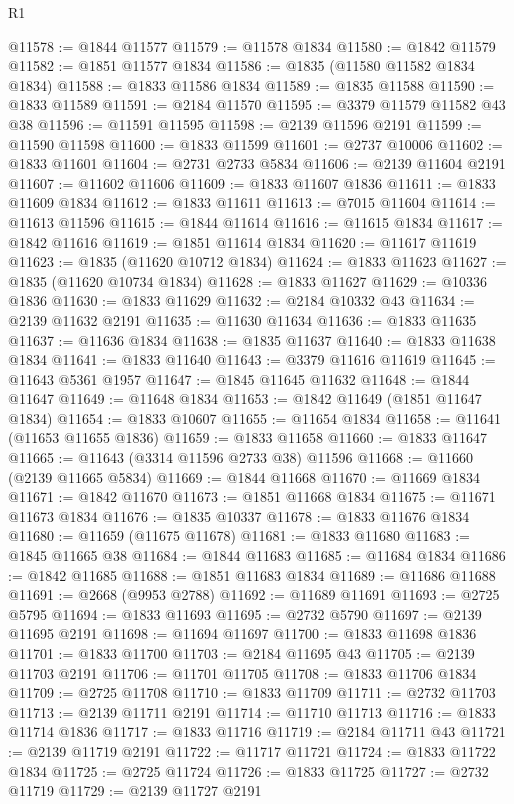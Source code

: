 \begin{lexlean}{R1}
\begin{coremodule}
@11578 := @1844 @11577
@11579 := @11578 @1834
@11580 := @1842 @11579
@11582 := @1851 @11577 @1834
@11586 := @1835 (@11580 @11582 @1834 @1834)
@11588 := @1833 @11586 @1834
@11589 := @1835 @11588
@11590 := @1833 @11589
@11591 := @2184 @11570
@11595 := @3379 @11579 @11582 @43 @38
@11596 := @11591 @11595
@11598 := @2139 @11596 @2191
@11599 := @11590 @11598
@11600 := @1833 @11599
@11601 := @2737 @10006
@11602 := @1833 @11601
@11604 := @2731 @2733 @5834
@11606 := @2139 @11604 @2191
@11607 := @11602 @11606
@11609 := @1833 @11607 @1836
@11611 := @1833 @11609 @1834
@11612 := @1833 @11611
@11613 := @7015 @11604
@11614 := @11613 @11596
@11615 := @1844 @11614
@11616 := @11615 @1834
@11617 := @1842 @11616
@11619 := @1851 @11614 @1834
@11620 := @11617 @11619
@11623 := @1835 (@11620 @10712 @1834)
@11624 := @1833 @11623
@11627 := @1835 (@11620 @10734 @1834)
@11628 := @1833 @11627
@11629 := @10336 @1836
@11630 := @1833 @11629
@11632 := @2184 @10332 @43
@11634 := @2139 @11632 @2191
@11635 := @11630 @11634
@11636 := @1833 @11635
@11637 := @11636 @1834
@11638 := @1835 @11637
@11640 := @1833 @11638 @1834
@11641 := @1833 @11640
@11643 := @3379 @11616 @11619
@11645 := @11643 @5361 @1957
@11647 := @1845 @11645 @11632
@11648 := @1844 @11647
@11649 := @11648 @1834
@11653 := @1842 @11649 (@1851 @11647 @1834)
@11654 := @1833 @10607
@11655 := @11654 @1834
@11658 := @11641 (@11653 @11655 @1836)
@11659 := @1833 @11658
@11660 := @1833 @11647
@11665 := @11643 (@3314 @11596 @2733 @38) @11596
@11668 := @11660 (@2139 @11665 @5834)
@11669 := @1844 @11668
@11670 := @11669 @1834
@11671 := @1842 @11670
@11673 := @1851 @11668 @1834
@11675 := @11671 @11673 @1834
@11676 := @1835 @10337
@11678 := @1833 @11676 @1834
@11680 := @11659 (@11675 @11678)
@11681 := @1833 @11680
@11683 := @1845 @11665 @38
@11684 := @1844 @11683
@11685 := @11684 @1834
@11686 := @1842 @11685
@11688 := @1851 @11683 @1834
@11689 := @11686 @11688
@11691 := @2668 (@9953 @2788)
@11692 := @11689 @11691
@11693 := @2725 @5795
@11694 := @1833 @11693
@11695 := @2732 @5790
@11697 := @2139 @11695 @2191
@11698 := @11694 @11697
@11700 := @1833 @11698 @1836
@11701 := @1833 @11700
@11703 := @2184 @11695 @43
@11705 := @2139 @11703 @2191
@11706 := @11701 @11705
@11708 := @1833 @11706 @1834
@11709 := @2725 @11708
@11710 := @1833 @11709
@11711 := @2732 @11703
@11713 := @2139 @11711 @2191
@11714 := @11710 @11713
@11716 := @1833 @11714 @1836
@11717 := @1833 @11716
@11719 := @2184 @11711 @43
@11721 := @2139 @11719 @2191
@11722 := @11717 @11721
@11724 := @1833 @11722 @1834
@11725 := @2725 @11724
@11726 := @1833 @11725
@11727 := @2732 @11719
@11729 := @2139 @11727 @2191

\end{coremodule}
\end{lexlean}
